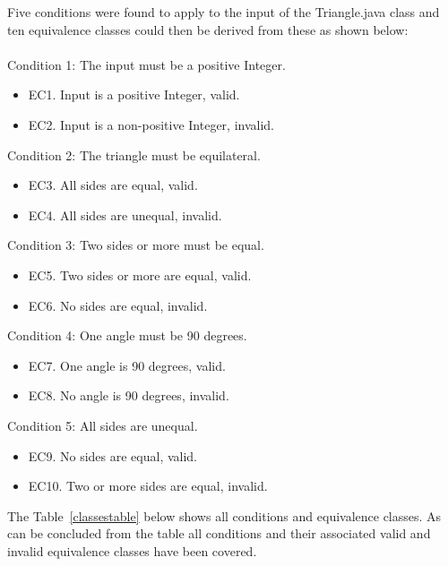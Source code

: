 Five conditions were found to apply to the input of the Triangle.java class and ten equivalence classes could then be derived from these as shown below: \\\\
\noindent Condition 1: The input must be a positive Integer.
\begin{itemize}
	\item EC1. Input is a positive Integer, valid.
	\item EC2. Input is a non-positive Integer, invalid.
\end{itemize}

\noindent Condition 2: The triangle must be equilateral.
\begin{itemize}
	\item EC3. All sides are equal, valid. 
	\item EC4. All sides are unequal, invalid. 
\end{itemize}

\noindent Condition 3: Two sides or more must be equal.  
\begin{itemize}
	\item EC5. Two sides or more are equal, valid. 
	\item EC6. No sides are equal, invalid. 
\end{itemize}

\noindent Condition 4: One angle must be 90 degrees. 
\begin{itemize}
	\item EC7. One angle is 90 degrees, valid. 
	\item EC8. No angle is 90 degrees, invalid. 
\end{itemize}

\noindent Condition 5: All sides are unequal. 
\begin{itemize}
	\item EC9. No sides are equal, valid. 
	\item EC10. Two or more sides are equal, invalid. 
\end{itemize}

\noindent The Table~\ref{classestable} below shows all conditions and equivalence classes. As can be concluded from the table all conditions and their associated valid and invalid equivalence classes have been covered.



